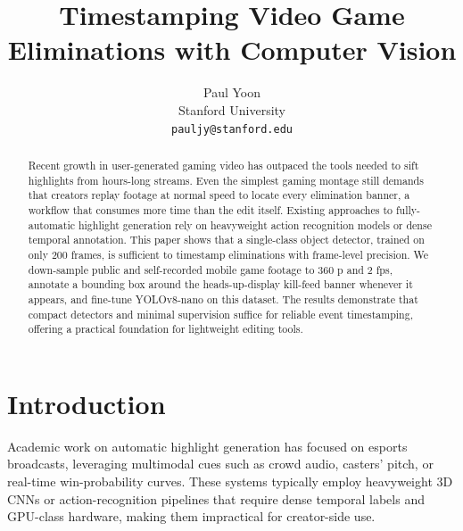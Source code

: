 \documentclass[10pt,twocolumn,letterpaper]{article}
\begin{document}
\title{Timestamping Video Game Eliminations with Computer Vision}

\author{Paul Yoon\\
Stanford University\\
{\tt\small pauljy@stanford.edu}
\and
}

\maketitle

\begin{abstract}
    Recent growth in user-generated gaming video has outpaced the tools needed to sift highlights from hours-long streams. Even the simplest gaming montage still demands that creators replay footage at normal speed to locate every elimination banner, a workflow that consumes more time than the edit itself. Existing approaches to fully-automatic highlight generation rely on heavyweight action recognition models or dense temporal annotation. This paper shows that a single-class object detector, trained on only 200 frames, is sufficient to timestamp eliminations with frame-level precision. We down-sample public and self-recorded mobile game footage to 360 p and 2 fps, annotate a bounding box around the heads-up-display kill-feed banner whenever it appears, and fine-tune YOLOv8-nano on this dataset. The results demonstrate that compact detectors and minimal supervision suffice for reliable event timestamping, offering a practical foundation for lightweight editing tools.

\end{abstract}
\section{Introduction}

Academic work on automatic highlight generation has focused on esports broadcasts, leveraging multimodal cues such as crowd audio, casters’ pitch, or real-time win-probability curves. These systems typically employ heavyweight 3D CNNs or action-recognition pipelines that require dense temporal labels and GPU-class hardware, making them impractical for creator-side use.
\cite{RINGER2022100338} \cite{10.1145/3341105.3373894}
\end{document}
